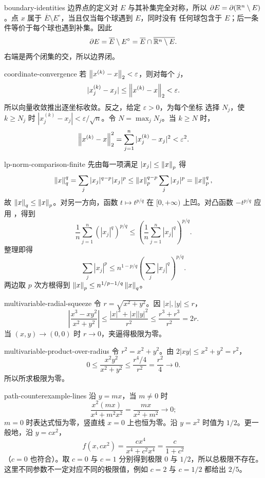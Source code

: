 \begin{solution}{boundary-identities}
边界点的定义对 \(E\) 与其补集完全对称，所以
\(\partial E=\partial(\mathbb{R}^n\setminus E)\)。点 \(x\) 属于
\(\overline E\setminus E^\circ\)，当且仅当每个球遇到 \(E\)，同时没有
任何球包含于 \(E\)；后一条件等价于每个球也遇到补集。因此
\[
 \partial E=\overline E\setminus E^\circ
 =\overline E\cap\overline{\mathbb{R}^n\setminus E}.
\]
右端是两个闭集的交，所以边界闭。
\end{solution}

\begin{solution}{coordinate-convergence}
若 \(\left\lVert x^{(k)}-x\right\rVert_2<\varepsilon\)，则对每个 \(j\)，
\[
 |x_j^{(k)}-x_j|\le\left\lVert x^{(k)}-x\right\rVert_2<\varepsilon.
\]
所以向量收敛推出逐坐标收敛。反之，给定 \(\varepsilon>0\)，为每个坐标
选择 \(N_j\)，使 \(k\ge N_j\) 时
\(|x_j^{(k)}-x_j|<\varepsilon/\sqrt n\)。令
\(N=\max_jN_j\)。当 \(k\ge N\) 时，
\[
 \left\lVert x^{(k)}-x\right\rVert_2^2
 =\sum_{j=1}^n|x_j^{(k)}-x_j|^2<\varepsilon^2.
\]
\end{solution}

\begin{solution}{lp-norm-comparison-finite}
先由每一项满足 \(|x_j|\le\left\lVert x\right\rVert_p\) 得
\[
 \left\lVert x\right\rVert_q^q
 =\sum_j|x_j|^{q-p}|x_j|^p
 \le\left\lVert x\right\rVert_p^{q-p}\sum_j|x_j|^p
 =\left\lVert x\right\rVert_p^q,
\]
故 \(\left\lVert x\right\rVert_q\le\left\lVert x\right\rVert_p\)。对另一方向，函数
\(t\mapsto t^{p/q}\) 在 \([0,+\infty)\) 上凹。对凸函数
\(-t^{p/q}\) 应用 ，得到
\[
 \frac1n\sum_{j=1}^n(|x_j|^q)^{p/q}
 \le\left(\frac1n\sum_{j=1}^n|x_j|^q\right)^{p/q}.
\]
整理即得
\[
 \sum_j|x_j|^p
 \le n^{1-p/q}\left(\sum_j|x_j|^q\right)^{p/q}.
\]
两边取 \(p\) 次方根得到
\(\left\lVert x\right\rVert_p\le n^{1/p-1/q}\left\lVert x\right\rVert_q\)。
\end{solution}

\begin{solution}{multivariable-radial-squeeze}
令 \(r=\sqrt{x^2+y^2}\)。因 \(|x|,|y|\le r\)，
\[
 \left|\frac{x^3-xy^2}{x^2+y^2}\right|
 \le\frac{|x|^3+|x||y|^2}{r^2}
 \le\frac{r^3+r^3}{r^2}=2r.
\]
当 \((x,y)\to(0,0)\) 时 \(r\to0\)，夹逼得极限为零。
\end{solution}

\begin{solution}{multivariable-product-over-radius}
令 \(r^2=x^2+y^2\)。由
\(2|xy|\le x^2+y^2=r^2\)，
\[
 0\le\frac{x^2y^2}{x^2+y^2}
 \le\frac{r^4/4}{r^2}=\frac{r^2}{4}\longrightarrow0.
\]
所以所求极限为零。
\end{solution}

\begin{solution}{path-counterexample-lines}
沿 \(y=mx\)，当 \(m\ne0\) 时
\[
 \frac{x^2(mx)}{x^4+m^2x^2}
 =\frac{mx}{x^2+m^2}\to0;
\]
\(m=0\) 时表达式恒为零，竖直线 \(x=0\) 上也恒为零。沿
\(y=x^2\) 时值为 \(1/2\)。更一般地，沿 \(y=cx^2\)，
\[
 f(x,cx^2)=\frac{cx^4}{x^4+c^2x^4}
 =\frac{c}{1+c^2}
\]
（\(c=0\) 也符合）。取 \(c=0\) 与 \(c=1\) 分别得到极限 \(0\) 与
\(1/2\)，所以总极限不存在。这里不同参数不一定对应不同的极限值，例如
\(c=2\) 与 \(c=1/2\) 都给出 \(2/5\)。
\end{solution}

